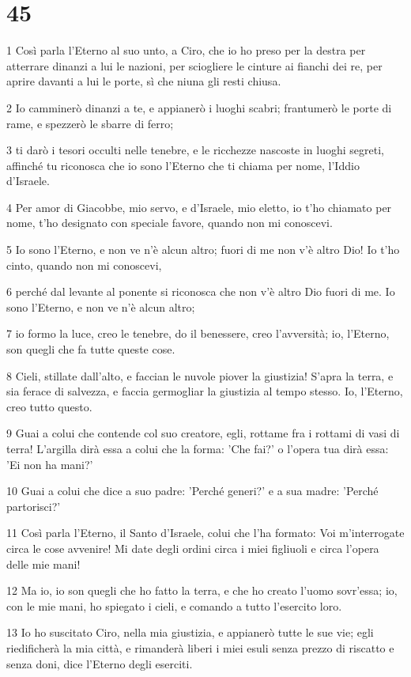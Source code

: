 \chapter{45}

\par 1 Così parla l'Eterno al suo unto, a Ciro, che io ho preso per la destra per atterrare dinanzi a lui le nazioni, per sciogliere le cinture ai fianchi dei re, per aprire davanti a lui le porte, sì che niuna gli resti chiusa.
\par 2 Io camminerò dinanzi a te, e appianerò i luoghi scabri; frantumerò le porte di rame, e spezzerò le sbarre di ferro;
\par 3 ti darò i tesori occulti nelle tenebre, e le ricchezze nascoste in luoghi segreti, affinché tu riconosca che io sono l'Eterno che ti chiama per nome, l'Iddio d'Israele.
\par 4 Per amor di Giacobbe, mio servo, e d'Israele, mio eletto, io t'ho chiamato per nome, t'ho designato con speciale favore, quando non mi conoscevi.
\par 5 Io sono l'Eterno, e non ve n'è alcun altro; fuori di me non v'è altro Dio! Io t'ho cinto, quando non mi conoscevi,
\par 6 perché dal levante al ponente si riconosca che non v'è altro Dio fuori di me. Io sono l'Eterno, e non ve n'è alcun altro;
\par 7 io formo la luce, creo le tenebre, do il benessere, creo l'avversità; io, l'Eterno, son quegli che fa tutte queste cose.
\par 8 Cieli, stillate dall'alto, e faccian le nuvole piover la giustizia! S'apra la terra, e sia ferace di salvezza, e faccia germogliar la giustizia al tempo stesso. Io, l'Eterno, creo tutto questo.
\par 9 Guai a colui che contende col suo creatore, egli, rottame fra i rottami di vasi di terra! L'argilla dirà essa a colui che la forma: 'Che fai?' o l'opera tua dirà essa: 'Ei non ha mani?'
\par 10 Guai a colui che dice a suo padre: 'Perché generi?' e a sua madre: 'Perché partorisci?'
\par 11 Così parla l'Eterno, il Santo d'Israele, colui che l'ha formato: Voi m'interrogate circa le cose avvenire! Mi date degli ordini circa i miei figliuoli e circa l'opera delle mie mani!
\par 12 Ma io, io son quegli che ho fatto la terra, e che ho creato l'uomo sovr'essa; io, con le mie mani, ho spiegato i cieli, e comando a tutto l'esercito loro.
\par 13 Io ho suscitato Ciro, nella mia giustizia, e appianerò tutte le sue vie; egli riedificherà la mia città, e rimanderà liberi i miei esuli senza prezzo di riscatto e senza doni, dice l'Eterno degli eserciti.
